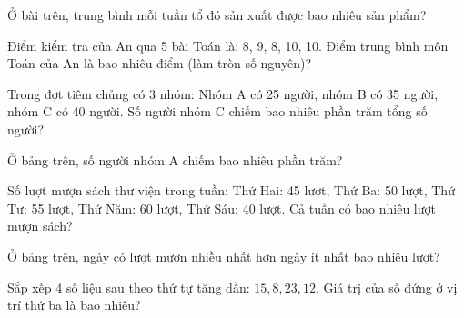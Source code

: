 \begin{ex}
  Ở bài trên, trung bình mỗi tuần tổ đó sản xuất được bao nhiêu sản phẩm?
\end{ex}

\begin{ex}
  Điểm kiểm tra của An qua 5 bài Toán là: 8, 9, 8, 10, 10. Điểm trung bình môn Toán của An là bao nhiêu điểm (làm tròn số nguyên)?
\end{ex}

\begin{ex}
  Trong đợt tiêm chủng có 3 nhóm: Nhóm A có 25 người, nhóm B có 35 người, nhóm C có 40 người. Số người nhóm C chiếm bao nhiêu phần trăm tổng số người?
\end{ex}

\begin{ex}
  Ở bảng trên, số người nhóm A chiếm bao nhiêu phần trăm?
\end{ex}

\begin{ex}
  Số lượt mượn sách thư viện trong tuần: Thứ Hai: 45 lượt, Thứ Ba: 50 lượt, Thứ Tư: 55 lượt, Thứ Năm: 60 lượt, Thứ Sáu: 40 lượt. Cả tuần có bao nhiêu lượt mượn sách?
\end{ex}

\begin{ex}
  Ở bảng trên, ngày có lượt mượn nhiều nhất hơn ngày ít nhất bao nhiêu lượt?
\end{ex}

\begin{ex}
  Sắp xếp 4 số liệu sau theo thứ tự tăng dần: $15, 8, 23, 12$. Giá trị của số đứng ở vị trí thứ ba là bao nhiêu?
\end{ex}
